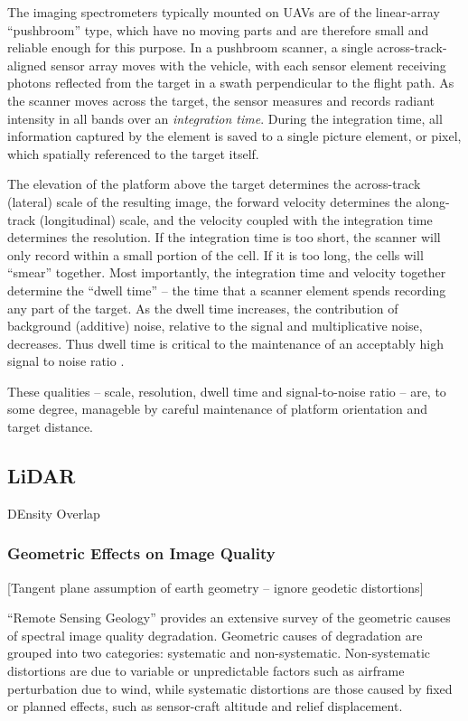 \documentclass[10pt]{article}
\begin{document}
The imaging spectrometers typically mounted on UAVs are of the linear-array ``pushbroom'' type, which have no moving parts and are therefore small and reliable enough for this purpose. In a pushbroom scanner, a single across-track-aligned sensor array moves with the vehicle, with each sensor element receiving photons reflected from the target in a swath perpendicular to the flight path. As the scanner moves across the target, the sensor measures and records radiant intensity in all bands over an \emph{integration time}. During the integration time, all information captured by the element is saved to a single picture element, or pixel, which spatially referenced to the target itself. 

The elevation of the platform above the target determines the across-track (lateral) scale of the resulting image, the forward velocity determines the along-track (longitudinal) scale, and the velocity coupled with the integration time determines the resolution. If the integration time is too short, the scanner will only record within a small portion of the cell. If it is  too long, the cells will ``smear'' together. Most importantly, the integration time and velocity together determine the ``dwell time'' -- the time that a scanner element spends recording any part of the target. As the dwell time increases, the contribution of background (additive) noise, relative to the signal and multiplicative noise, decreases. Thus dwell time is critical to the maintenance of an acceptably high signal to noise ratio \cite{F.MarkDanson1996,Avery1992,Rogass2014}.

These qualities -- scale, resolution, dwell time and signal-to-noise ratio -- are, to some degree, manageble by careful maintenance of platform orientation and target distance. 


\subsection{LiDAR}

DEnsity
Overlap


\subsubsection{Geometric Effects on Image Quality}

[Tangent plane assumption of earth geometry -- ignore geodetic distortions]

``Remote Sensing Geology'' \cite{Gupta2018} provides an extensive survey of the geometric causes of spectral image quality degradation. Geometric causes of degradation are grouped into two categories: systematic and non-systematic. Non-systematic distortions are due to variable or unpredictable factors such as airframe perturbation due to wind, while systematic distortions are those caused by fixed or planned effects, such as sensor-craft altitude and relief displacement.
\end{document}

